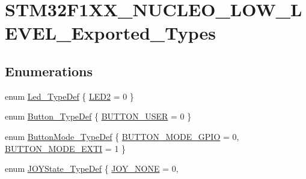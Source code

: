 \hypertarget{group___s_t_m32_f1_x_x___n_u_c_l_e_o___l_o_w___l_e_v_e_l___exported___types}{}\section{S\+T\+M32\+F1\+X\+X\+\_\+\+N\+U\+C\+L\+E\+O\+\_\+\+L\+O\+W\+\_\+\+L\+E\+V\+E\+L\+\_\+\+Exported\+\_\+\+Types}
\label{group___s_t_m32_f1_x_x___n_u_c_l_e_o___l_o_w___l_e_v_e_l___exported___types}
\subsection*{Enumerations}
\begin{DoxyCompactItemize}
\item 
enum \mbox{\hyperlink{group___s_t_m32_f1_x_x___n_u_c_l_e_o___l_o_w___l_e_v_e_l___exported___types_gaa059704b7ca945eb9c1e7f2c3d03fecd}{Led\+\_\+\+Type\+Def}} \{ \mbox{\hyperlink{group___s_t_m32_f1_x_x___n_u_c_l_e_o___l_o_w___l_e_v_e_l___exported___types_ggaa059704b7ca945eb9c1e7f2c3d03fecda8379bbaa96d151e6adac488b2a147b7a}{L\+E\+D2}} = 0
 \}
\item 
enum \mbox{\hyperlink{group___s_t_m32_f1_x_x___n_u_c_l_e_o___l_o_w___l_e_v_e_l___exported___types_ga643816dfbad5c734fc25a29ce8d35bb1}{Button\+\_\+\+Type\+Def}} \{ \mbox{\hyperlink{group___s_t_m32_f1_x_x___n_u_c_l_e_o___l_o_w___l_e_v_e_l___exported___types_gga643816dfbad5c734fc25a29ce8d35bb1a6454f3dfd31c55a877e1b6684451d076}{B\+U\+T\+T\+O\+N\+\_\+\+U\+S\+ER}} = 0
 \}
\item 
enum \mbox{\hyperlink{group___s_t_m32_f1_x_x___n_u_c_l_e_o___l_o_w___l_e_v_e_l___exported___types_ga48825b7c7d851c440ef8e808fd9d8f0a}{Button\+Mode\+\_\+\+Type\+Def}} \{ \mbox{\hyperlink{group___s_t_m32_f1_x_x___n_u_c_l_e_o___l_o_w___l_e_v_e_l___exported___types_gga48825b7c7d851c440ef8e808fd9d8f0aa9411f3542831027b24c493abfb998522}{B\+U\+T\+T\+O\+N\+\_\+\+M\+O\+D\+E\+\_\+\+G\+P\+IO}} = 0, 
\mbox{\hyperlink{group___s_t_m32_f1_x_x___n_u_c_l_e_o___l_o_w___l_e_v_e_l___exported___types_gga48825b7c7d851c440ef8e808fd9d8f0aa13c1ad97bc3db33d7f2b5a7c116bc8f5}{B\+U\+T\+T\+O\+N\+\_\+\+M\+O\+D\+E\+\_\+\+E\+X\+TI}} = 1
 \}
\item 
enum \mbox{\hyperlink{group___s_t_m32_f1_x_x___n_u_c_l_e_o___l_o_w___l_e_v_e_l___exported___types_ga7466d9ae142b713772373c9ddfc90332}{J\+O\+Y\+State\+\_\+\+Type\+Def}} \{ \newline
\mbox{\hyperlink{group___s_t_m32_f1_x_x___n_u_c_l_e_o___l_o_w___l_e_v_e_l___exported___types_gga7466d9ae142b713772373c9ddfc90332a310776ae6ccdcf448ef29f9ba115e9d8}{J\+O\+Y\+\_\+\+N\+O\+NE}} = 0, 

\end{DoxyCompactItemize}
